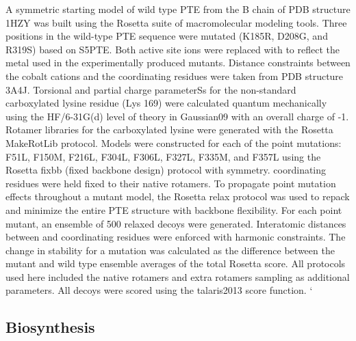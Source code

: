 \begin{refsection}
A symmetric starting model of wild type PTE from the B chain of PDB structure
1HZY\cite{Benning2001a} was built using the Rosetta suite of macromolecular
modeling tools\cite{Leaver-Fay2011}. Three positions in the
wild-type PTE sequence were mutated (K185R, D208G, and R319S) based on
S5PTE\cite{Roodveldt2005}. Both active site  ions were
replaced with  to reflect the metal used in the experimentally
produced mutants.  Distance constraints between the cobalt cations and the
coordinating residues were taken from PDB structure 3A4J\cite{Jackson2009b}.
Torsional and partial charge parameterSs for the non-standard carboxylated
lysine residue (Lys 169) were calculated quantum mechanically using the
HF/6-31G(d) level of theory in Gaussian09\cite{Frisch2009a} with an overall
charge of -1.  Rotamer libraries for the carboxylated lysine were generated
with the Rosetta MakeRotLib\cite{Renfrew2012b} protocol.  Models were
constructed for each of the point mutations: F51L, F150M, F216L, F304L, F306L,
F327L, F335M, and F357L using the Rosetta fixbb (fixed backbone design)
protocol with symmetry\cite{DiMaio2011a}.   coordinating residues
were held fixed to their native rotamers. To propagate point mutation effects
throughout a mutant model, the Rosetta relax protocol was used to repack and
minimize the entire PTE structure with backbone flexibility. For each point
mutant, an ensemble of 500 relaxed decoys were generated. Interatomic distances
between  and coordinating residues were enforced with harmonic
constraints.  The change in stability for a mutation was calculated as the
difference between the mutant and wild type ensemble averages of the total
Rosetta score. All protocols used here included the native rotamers and extra
rotamers sampling as additional parameters. All decoys were scored using the
talaris2013 score function\cite{Leaver-Fay2013a}.
`
\subsection{Biosynthesis}


\end{refsection}
